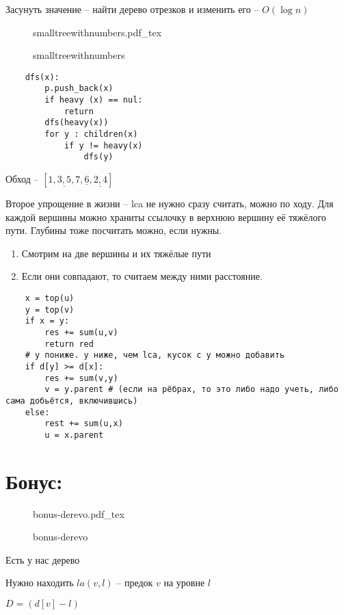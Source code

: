 \documentclass{book}
\theoremstyle{definition}
\newcommand{\incfig}[1]{%
    \def\svgwidth{\columnwidth}
    {#1.pdf_tex}
}
\begin{document}
Засунуть значение -- найти дерево отрезков и изменить его -- $O(\log n)$

\begin{figure}[!ht]
    \centering
    \incfig{smalltreewithnumbers}
    \caption{smalltreewithnumbers}
    \label{fig:smalltreewithnumbers}
\end{figure}

\begin{lstlisting}
    dfs(x):
        p.push_back(x)
        if heavy (x) == nul:
            return
        dfs(heavy(x))
        for y : children(x)
            if y != heavy(x)
                dfs(y)
\end{lstlisting}
Обход -- $\left[ \underline{1,3,5,7},\underline{6},\underline{2,4} \right] $

Второе упрощение в жизни -- lca не нужно сразу считать, можно по ходу. Для каждой вершины можно храниты ссылочку в верхнюю вершину её тяжёлого пути. Глубины тоже посчитать можно, если нужны.

\begin{enumerate}
    \item Смотрим на две вершины и их тяжёлые пути
    \item Если они совпадают, то считаем между ними расстояние.
\end{enumerate}

\begin{lstlisting}
    x = top(u)
    y = top(v)
    if x = y:
        res += sum(u,v)
        return red
    # y пониже. y ниже, чем lca, кусок с y можно добавить
    if d[y] >= d[x]:
        res += sum(v,y)
        v = y.parent # (если на рёбрах, то это либо надо учеть, либо сама добьётся, включившись)
    else:
        rest += sum(u,x)
        u = x.parent
\end{lstlisting}

\section{Бонус: }
\begin{figure}[!ht]
    \centering
    \incfig{bonus-derevo}
    \caption{bonus-derevo}
    \label{fig:bonus-derevo}
\end{figure}
\begin{problem}
    Есть у нас дерево

Нужно находить $la(v,l)$ -- предок  $v$ на уровне $l$

$D = \left( d[v] - l \right) $
\end{problem}
\end{document}
